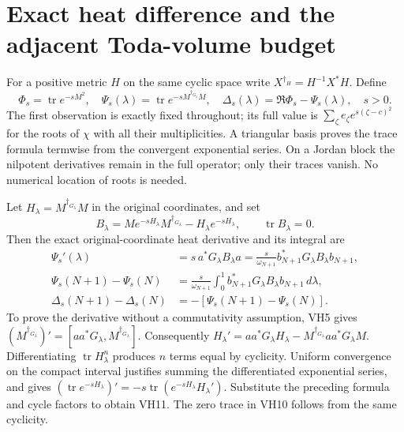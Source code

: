 \documentclass[11pt]{article}
\newcommand{\tr}{\operatorname{tr}}\newcommand{\norm}[1]{\left\lVert#1\right\rVert}
\begin{document}
\section{Exact heat difference and the adjacent Toda-volume budget}

For a positive metric \(H\) on the same cyclic space write
\(X^{\dagger_H}=H^{-1}X^*H\). Define
\begin{equation}\tag{VH9}\label{VH9}
\Phi_s=\tr e^{-sM^2},\quad
\Psi_s(\lambda)=\tr e^{-sM^{\dagger_{G_\lambda}}M},\quad
\Delta_s(\lambda)=\Re\Phi_s-\Psi_s(\lambda),\quad s>0.
\end{equation}
The first observation is exactly fixed throughout; its full value is
\(\sum_\zeta e_\zeta e^{s(\zeta-c)^2}\) for the roots of \(\chi\)
with all their multiplicities. A triangular basis proves the trace
formula termwise from the convergent exponential series. On a Jordan
block the nilpotent derivatives remain in the full operator; only
their traces vanish. No numerical location of roots is needed.

Let \(H_\lambda=M^{\dagger_{G_\lambda}}M\) in the original coordinates,
and set
\begin{equation}\tag{VH10}\label{VH10}
B_\lambda=M e^{-sH_\lambda}M^{\dagger_{G_\lambda}}
-H_\lambda e^{-sH_\lambda},\qquad \tr B_\lambda=0.
\end{equation}
Then the exact original-coordinate heat derivative and its integral are
\begin{equation}\tag{VH11}\label{VH11}
\begin{split}
\Psi_s'(\lambda)&=s\,a^*G_\lambda B_\lambda a
=\frac{s}{\omega_{N+1}}b_{N+1}^*G_\lambda B_\lambda b_{N+1},\\
\Psi_s(N+1)-\Psi_s(N)
&=\frac{s}{\omega_{N+1}}\int_0^1
b_{N+1}^*G_\lambda B_\lambda b_{N+1}\,d\lambda,\\
\Delta_s(N+1)-\Delta_s(N)&=-[\Psi_s(N+1)-\Psi_s(N)].
\end{split}
\end{equation}
To prove the derivative without a commutativity assumption, VH5 gives
\((M^{\dagger_{G_\lambda}})'=[aa^*G_\lambda,M^{\dagger_{G_\lambda}}]\).
Consequently
\(H_\lambda'=aa^*G_\lambda H_\lambda-
M^{\dagger_{G_\lambda}}aa^*G_\lambda M\).
Differentiating \(\tr H_\lambda^n\) produces \(n\) terms equal by
cyclicity. Uniform convergence on the compact interval justifies
summing the differentiated exponential series, and gives
\((\tr e^{-sH_\lambda})'=-s\tr(e^{-sH_\lambda}H_\lambda')\).
Substitute the preceding formula and cycle factors to obtain VH11.
The zero trace in VH10 follows from the same cyclicity.
\end{document}
